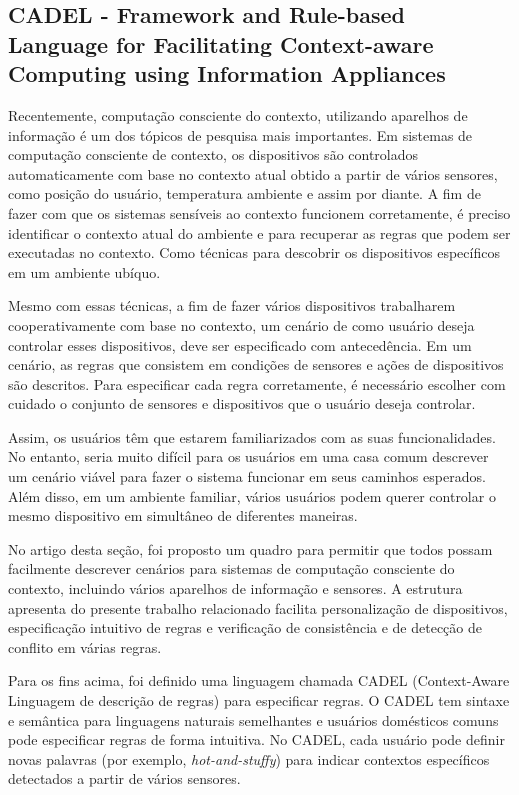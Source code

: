 \documentclass[12pt,a4paper,compsoc]{IEEEtran}
\begin{document}
\subsection{CADEL - Framework and Rule-based Language for Facilitating Context-aware Computing
 using Information Appliances}

  Recentemente, computação consciente do contexto, utilizando aparelhos de informação é um dos
  tópicos de pesquisa mais importantes. Em sistemas de computação consciente de contexto, os
  dispositivos são controlados automaticamente com base no contexto atual obtido a partir de vários
  sensores, como posição do usuário, temperatura ambiente e assim por diante. A fim de fazer com
  que os sistemas sensíveis ao contexto funcionem corretamente, é preciso identificar o contexto
  atual do ambiente e para recuperar as regras que podem ser executadas no contexto. Como técnicas
  para descobrir os dispositivos específicos em um ambiente ubíquo.
  
  Mesmo com essas técnicas, a fim de fazer vários dispositivos trabalharem cooperativamente com base
  no contexto, um cenário de como usuário deseja controlar esses dispositivos, deve ser especificado
  com antecedência. Em um cenário, as regras que consistem em condições de sensores e ações de
  dispositivos são descritos. Para especificar cada regra corretamente, é necessário escolher com
  cuidado o conjunto de sensores e dispositivos que o usuário deseja controlar.
  
  Assim, os usuários têm que estarem familiarizados com as suas funcionalidades. No entanto, seria
  muito difícil para os usuários em uma casa comum descrever um cenário viável para fazer o sistema
  funcionar em seus caminhos esperados. Além disso, em um ambiente familiar, vários usuários podem
  querer controlar o mesmo dispositivo em simultâneo de diferentes maneiras.
  
  No artigo desta seção, foi proposto um quadro para permitir que todos possam facilmente descrever
  cenários para sistemas de computação consciente do contexto, incluindo vários aparelhos de
  informação e sensores. A estrutura apresenta do presente trabalho relacionado facilita
  personalização de dispositivos, especificação intuitivo de regras e verificação de consistência e de
  detecção de conflito em várias regras.
  
  Para os fins acima, foi definido uma linguagem chamada CADEL (Context-Aware Linguagem de descrição
  de regras) para especificar regras. O CADEL tem sintaxe e semântica para linguagens naturais
  semelhantes e usuários domésticos comuns pode especificar regras de forma intuitiva. No CADEL, cada
  usuário pode definir novas palavras (por exemplo, \textit{hot-and-stuffy}) para indicar contextos
  específicos detectados a partir de vários sensores.
  
\end{document}

